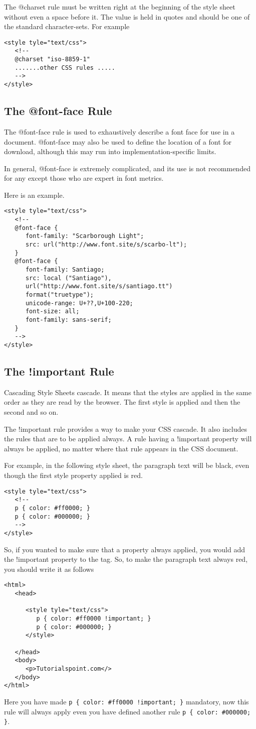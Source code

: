 \documentclass[a4paper,oneside]{book}
\numberwithin{equation}{chapter}
\begin{document}
The @charset rule must be written right at the beginning of the style sheet without even a space before it. The value is held in quotes and should be one of the standard character-sets. For example
\begin{verbatim}
<style tyle="text/css">
   <!--
   @charset "iso-8859-1"
   .......other CSS rules .....
   -->
</style>
\end{verbatim}
\subsection{The @font-face Rule}
The @font-face rule is used to exhaustively describe a font face for use in a document. @font-face may also be used to define the location of a font for download, although this may run into implementation-specific limits.

In general, @font-face is extremely complicated, and its use is not recommended for any except those who are expert in font metrics.

Here is an example.
\begin{verbatim}
<style tyle="text/css">
   <!--
   @font-face {
      font-family: "Scarborough Light";
      src: url("http://www.font.site/s/scarbo-lt");
   }
   @font-face {
      font-family: Santiago;
      src: local ("Santiago"),
      url("http://www.font.site/s/santiago.tt")
      format("truetype");
      unicode-range: U+??,U+100-220;
      font-size: all;
      font-family: sans-serif;
   }
   -->
</style>
\end{verbatim}
\subsection{The !important Rule}
Cascading Style Sheets cascade. It means that the styles are applied in the same order as they are read by the browser. The first style is applied and then the second and so on.

The !important rule provides a way to make your CSS cascade. It also includes the rules that are to be applied always. A rule having a !important property will always be applied, no matter where that rule appears in the CSS document.

For example, in the following style sheet, the paragraph text will be black, even though the first style property applied is red.
\begin{verbatim}
<style tyle="text/css">
   <!--
   p { color: #ff0000; }
   p { color: #000000; }
   -->
</style>
\end{verbatim}
So, if you wanted to make sure that a property always applied, you would add the !important property to the tag. So, to make the paragraph text always red, you should write it as follows
\begin{verbatim}
<html>
   <head>
   
      <style tyle="text/css">
         p { color: #ff0000 !important; }
         p { color: #000000; }
      </style>
      
   </head>
   <body>
      <p>Tutorialspoint.com</>
   </body>
</html> 
\end{verbatim}
Here you have made \verb|p { color: #ff0000 !important; }| mandatory, now this rule will always apply even you have defined another rule \verb|p { color: #000000; }|.
\end{document}

